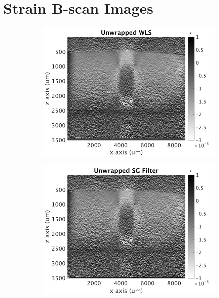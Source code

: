 \chapter{Strain B-scan Images}\label{images}

\begin{figure}[h]
	\centering
    \begin{subfigure}{0.49\textwidth}
    	\centering
        \includegraphics[width=\textwidth]{appendix_figs/wls_fr40_lr0.png}
    \end{subfigure}
    \begin{subfigure}{0.49\textwidth}
    	\centering
        \includegraphics[width=\textwidth]{appendix_figs/uwsg_fr40_lr0.png}
    \end{subfigure}

\end{figure}
